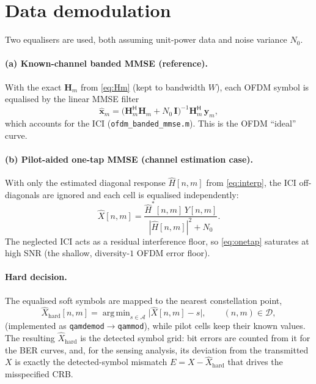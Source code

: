 \documentclass[11pt]{article}
\DeclareMathOperator*{\argmin}{arg\,min}
\begin{document}
\section{Data demodulation}

Two equalisers are used, both assuming unit-power data and noise variance $N_0$.

\paragraph{(a) Known-channel banded MMSE (reference).}
With the exact $\bm H_m$ from \eqref{eq:Hm} (kept to bandwidth $W$), each OFDM
symbol is equalised by the linear MMSE filter
\begin{equation}
  \widehat{\bm x}_m=\big(\bm H_m^{\mathsf H}\bm H_m+N_0\,\bm I\big)^{-1}
                    \bm H_m^{\mathsf H}\,\bm y_m ,
  \label{eq:bmmse}
\end{equation}
which accounts for the ICI (\texttt{ofdm\_banded\_mmse.m}). This is the OFDM
``ideal'' curve.

\paragraph{(b) Pilot-aided one-tap MMSE (channel estimation case).}
With only the estimated diagonal response $\widehat{H}[n,m]$ from
\eqref{eq:interp}, the ICI off-diagonals are ignored and each cell is equalised
independently:
\begin{equation}
  \widehat{X}[n,m]=\frac{\widehat{H}^{*}[n,m]\,Y[n,m]}
                        {\,|\widehat{H}[n,m]|^{2}+N_0\,}.
  \label{eq:onetap}
\end{equation}
The neglected ICI acts as a residual interference floor, so \eqref{eq:onetap}
saturates at high SNR (the shallow, diversity-$1$ OFDM error floor).

\paragraph{Hard decision.}
The equalised soft symbols are mapped to the nearest constellation point,
\begin{equation}
  \widehat{X}_{\mathrm{hard}}[n,m]=
     \argmin_{s\in\mathcal{A}}\big|\widehat{X}[n,m]-s\big|,\qquad (n,m)\in\mathcal{D},
\end{equation}
(implemented as \texttt{qamdemod}$\to$\texttt{qammod}), while pilot cells keep
their known values. The resulting $\widehat{X}_{\mathrm{hard}}$ is the detected
symbol grid: bit errors are counted from it for the BER curves, and, for the
sensing analysis, its deviation from the transmitted $X$ is exactly the
detected-symbol mismatch $E=X-\widehat{X}_{\mathrm{hard}}$ that drives the
misspecified CRB.
\end{document}
